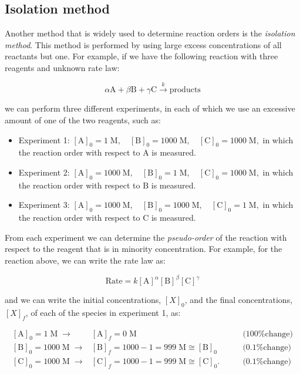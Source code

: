 \documentclass[
  9pt,
]{extbook}
\theoremstyle{definition}
\theoremstyle{definition}
\theoremstyle{definition}
\theoremstyle{definition}
\theoremstyle{remark}
\begin{document}
\subsection{Isolation method}\label{isolation-method}

Another method that is widely used to determine reaction orders is the \emph{isolation method}. This method is performed by using large excess concentrations of all reactants but one. For example, if we have the following reaction with three reagents and unknown rate law:

\begin{equation}
\alpha \mathrm{A} + \beta \mathrm{B} + \gamma \mathrm{C} \xrightarrow{k} \text{products}
\end{equation}

we can perform three different experiments, in each of which we use an excessive amount of one of the two reagents, such as:

\begin{itemize}
\item
  Experiment 1: \([\mathrm{A}]_0=1\;\text{M},\quad [\mathrm{B}]_0=1000\;\text{M}, \quad [\mathrm{C}]_0=1000\;\text{M},\) in which the reaction order with respect to \(\mathrm{A}\) is measured.
\item
  Experiment 2: \([\mathrm{A}]_0=1000\;\text{M},\quad [\mathrm{B}]_0=1\;\text{M}, \quad [\mathrm{C}]_0=1000\;\text{M},\) in which the reaction order with respect to \(\mathrm{B}\) is measured.
\item
  Experiment 3: \([\mathrm{A}]_0=1000\;\text{M},\quad [\mathrm{B}]_0=1000\;\text{M}, \quad [\mathrm{C}]_0=1\;\text{M},\) in which the reaction order with respect to \(\mathrm{C}\) is measured.
\end{itemize}

From each experiment we can determine the \emph{pseudo-order} of the reaction with respect to the reagent that is in minority concentration. For example, for the reaction above, we can write the rate law as:

\begin{equation}
\text{Rate}=k[\mathrm{A}]^{\alpha}[\mathrm{B}]^{\beta}[\mathrm{C}]^{\gamma}
\label{eq:kiniso2}
\end{equation}

and we can write the initial concentrations, \([X]_0\), and the final concentrations, \([X]_f\), of each of the species in experiment 1, as:

\begin{equation}
\begin{aligned}
\left[\mathrm{A}\right]_0 =1\;\text{M}\;\longrightarrow &[\mathrm{A}]_f=0\;\text{M} \qquad &\text{(100\% change)} \\
\left[\mathrm{B}\right]_0 =1000\;\text{M}\;\longrightarrow &[\mathrm{B}]_f=1000-1=999\;\text{M}\cong [\mathrm{B}]_0\qquad &\text{(0.1\% change)}\\
\left[\mathrm{C}\right]_0 =1000\;\text{M}\;\longrightarrow &[\mathrm{C}]_f=1000-1=999\;\text{M} \cong \left[\mathrm{C}\right]_0. \qquad &\text{(0.1\% change)}
\end{aligned}
\end{equation}
\end{document}
